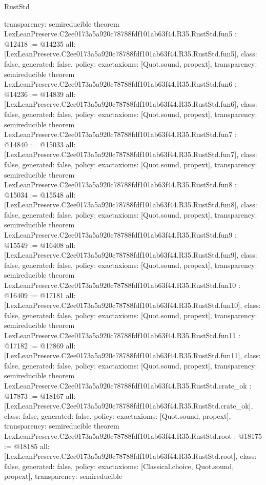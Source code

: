\begin{lexlean}{RustStd}
\begin{coremodule}
{  transparency: semireducible
}
theorem LexLeanPreserve.C2ee0173a5a920c78788fdf101ab63f44.R35.RustStd.fun5 : @12418 := @14235 {
  all: [LexLeanPreserve.C2ee0173a5a920c78788fdf101ab63f44.R35.RustStd.fun5],
  class: false,
  generated: false,
  policy: exact{axioms: [Quot.sound, propext]},
  transparency: semireducible
}
theorem LexLeanPreserve.C2ee0173a5a920c78788fdf101ab63f44.R35.RustStd.fun6 : @14236 := @14839 {
  all: [LexLeanPreserve.C2ee0173a5a920c78788fdf101ab63f44.R35.RustStd.fun6],
  class: false,
  generated: false,
  policy: exact{axioms: [Quot.sound, propext]},
  transparency: semireducible
}
theorem LexLeanPreserve.C2ee0173a5a920c78788fdf101ab63f44.R35.RustStd.fun7 : @14840 := @15033 {
  all: [LexLeanPreserve.C2ee0173a5a920c78788fdf101ab63f44.R35.RustStd.fun7],
  class: false,
  generated: false,
  policy: exact{axioms: [Quot.sound, propext]},
  transparency: semireducible
}
theorem LexLeanPreserve.C2ee0173a5a920c78788fdf101ab63f44.R35.RustStd.fun8 : @15034 := @15548 {
  all: [LexLeanPreserve.C2ee0173a5a920c78788fdf101ab63f44.R35.RustStd.fun8],
  class: false,
  generated: false,
  policy: exact{axioms: [Quot.sound, propext]},
  transparency: semireducible
}
theorem LexLeanPreserve.C2ee0173a5a920c78788fdf101ab63f44.R35.RustStd.fun9 : @15549 := @16408 {
  all: [LexLeanPreserve.C2ee0173a5a920c78788fdf101ab63f44.R35.RustStd.fun9],
  class: false,
  generated: false,
  policy: exact{axioms: [Quot.sound, propext]},
  transparency: semireducible
}
theorem LexLeanPreserve.C2ee0173a5a920c78788fdf101ab63f44.R35.RustStd.fun10 : @16409 := @17181 {
  all: [LexLeanPreserve.C2ee0173a5a920c78788fdf101ab63f44.R35.RustStd.fun10],
  class: false,
  generated: false,
  policy: exact{axioms: [Quot.sound, propext]},
  transparency: semireducible
}
theorem LexLeanPreserve.C2ee0173a5a920c78788fdf101ab63f44.R35.RustStd.fun11 : @17182 := @17869 {
  all: [LexLeanPreserve.C2ee0173a5a920c78788fdf101ab63f44.R35.RustStd.fun11],
  class: false,
  generated: false,
  policy: exact{axioms: [Quot.sound, propext]},
  transparency: semireducible
}
theorem LexLeanPreserve.C2ee0173a5a920c78788fdf101ab63f44.R35.RustStd.crate_ok : @17873 := @18167 {
  all: [LexLeanPreserve.C2ee0173a5a920c78788fdf101ab63f44.R35.RustStd.crate_ok],
  class: false,
  generated: false,
  policy: exact{axioms: [Quot.sound, propext]},
  transparency: semireducible
}
theorem LexLeanPreserve.C2ee0173a5a920c78788fdf101ab63f44.R35.RustStd.root : @18175 := @18185 {
  all: [LexLeanPreserve.C2ee0173a5a920c78788fdf101ab63f44.R35.RustStd.root],
  class: false,
  generated: false,
  policy: exact{axioms: [Classical.choice, Quot.sound, propext]},
  transparency: semireducible
}


\end{coremodule}
\end{lexlean}
